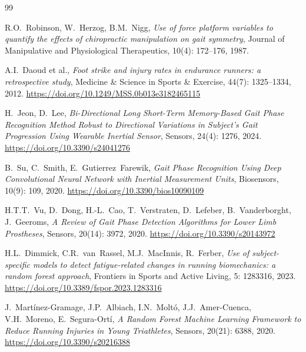 \begin{thebibliography}{99}

R.O.\ Robinson, W.\ Herzog, B.M.\ Nigg,
\textit{Use of force platform variables to quantify the effects of chiropractic manipulation on gait symmetry},
Journal of Manipulative and Physiological Therapeutics, 10(4): 172--176, 1987.

A.I.\ Daoud et al.,
\textit{Foot strike and injury rates in endurance runners: a retrospective study},
Medicine \& Science in Sports \& Exercise, 44(7): 1325--1334, 2012.
\url{https://doi.org/10.1249/MSS.0b013e3182465115}


H.\ Jeon, D.\ Lee,
\textit{Bi-Directional Long Short-Term Memory-Based Gait Phase Recognition Method Robust to Directional Variations in Subject's Gait Progression Using Wearable Inertial Sensor},
Sensors, 24(4): 1276, 2024.
\url{https://doi.org/10.3390/s24041276}

B.\ Su, C.\ Smith, E.\ Gutierrez~Farewik,
\textit{Gait Phase Recognition Using Deep Convolutional Neural Network with Inertial Measurement Units},
Biosensors, 10(9): 109, 2020.
\url{https://doi.org/10.3390/bios10090109}

H.T.T.\ Vu, D.\ Dong, H.-L.\ Cao, T.\ Verstraten, D.\ Lefeber, B.\ Vanderborght, J.\ Geeroms,
\textit{A Review of Gait Phase Detection Algorithms for Lower Limb Prostheses},
Sensors, 20(14): 3972, 2020.
\url{https://doi.org/10.3390/s20143972}

H.L.\ Dimmick, C.R.\ van~Rassel, M.J.\ MacInnis, R.\ Ferber,
\textit{Use of subject-specific models to detect fatigue-related changes in running biomechanics: a random forest approach},
Frontiers in Sports and Active Living, 5: 1283316, 2023.
\url{https://doi.org/10.3389/fspor.2023.1283316}

J.\ Mart\'{i}nez-Gramage, J.P.\ Albiach, I.N.\ Molt\'{o}, J.J.\ Amer-Cuenca, V.H.\ Moreno, E.\ Segura-Ort\'{i},
\textit{A Random Forest Machine Learning Framework to Reduce Running Injuries in Young Triathletes},
Sensors, 20(21): 6388, 2020.
\url{https://doi.org/10.3390/s20216388}


\end{thebibliography}
